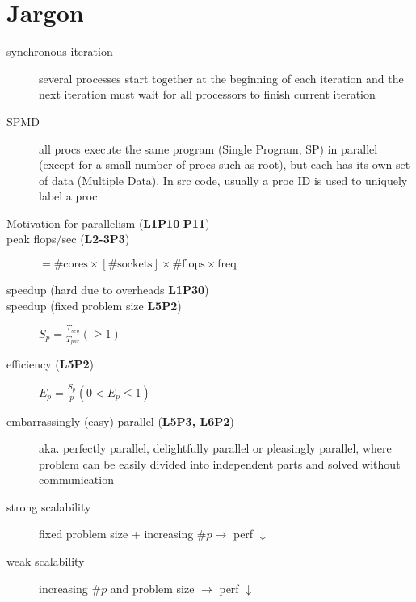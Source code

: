 \section*{Jargon}
\begin{description}
\item[synchronous iteration] several processes start together at the beginning of each iteration and the next iteration must wait for all processors to finish current iteration
\item[SPMD] all procs execute the same program (Single Program, SP) in parallel (except for a small number of procs such as root), but each has its own set of data (Multiple Data). In src code, usually a proc ID is used to uniquely label a proc
\item[Motivation for parallelism (\textbf{L1P10}-\textbf{P11})]
\item[peak flops/sec (\textbf{L2-3P3})] $ = \# \text{cores} \times [\# \text{sockets}] \times \# \text{flops} \times \text{freq}$
\item[speedup (hard due to overheads \textbf{L1P30})]
\item[speedup (fixed problem size \textbf{L5P2})] $S_p = \frac{T_{seq}}{T_{par}} (\geq 1)$
\item[efficiency (\textbf{L5P2})] $E_p = \frac{S_{p}}{p} (0 < E_p \leq 1)$
\item[embarrassingly (easy) parallel (\textbf{L5P3, L6P2})] aka. perfectly parallel, delightfully parallel or pleasingly parallel, where problem can be easily divided into independent parts and solved without communication
\item[strong scalability] fixed problem size + increasing $\# p \rightarrow$ perf $\downarrow$
\item[weak scalability] increasing $\# p$ and problem size $\rightarrow$ perf $\downarrow$

\end{description}

